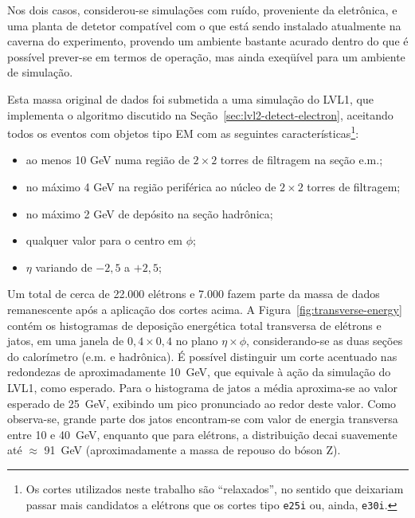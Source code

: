Nos dois casos, considerou-se simulações com ruído, proveniente da eletrônica,
e uma planta de detetor compatível com o que está sendo instalado atualmente
na caverna do experimento, provendo um ambiente bastante acurado dentro do que
é possível prever-se em termos de operação, mas ainda exeqüível para um
ambiente de simulação.

Esta massa original de dados foi submetida a uma simulação do LVL1, que
implementa o algoritmo discutido na Seção~\ref{sec:lvl2-detect-electron},
aceitando todos os eventos com objetos tipo EM com as seguintes
características\footnote{Os cortes utilizados neste trabalho são
``relaxados'', no sentido que deixariam passar mais candidatos a elétrons que
os cortes tipo \texttt{e25i} ou, ainda, \texttt{e30i}.}:

\begin{itemize}
\item ao menos 10 GeV numa região de $2\times2$ torres de filtragem na seção
e.m.;
\item no máximo 4 GeV na região periférica ao núcleo de $2\times2$ torres de
filtragem; 
\item no máximo 2 GeV de depósito na seção hadrônica;
\item qualquer valor para o centro em $\phi$;
\item $\eta$ variando de $-2,5$ a $+2,5$;
\end{itemize}

Um total de cerca de 22.000 elétrons e 7.000 fazem parte da massa de dados
remanescente após a aplicação dos cortes acima. A
Figura~\ref{fig:transverse-energy} contém os histogramas de deposição
energética total transversa de elétrons e jatos, em uma janela de $0,4 \times
0,4$ no plano $\eta\times\phi$, considerando-se as duas seções do calorímetro
(e.m. e hadrônica). É possível distinguir um corte acentuado nas redondezas de
aproximadamente 10~GeV, que equivale à ação da simulação do LVL1, como
esperado. Para o histograma de jatos a média aproxima-se ao valor esperado de
25~GeV, exibindo um pico pronunciado ao redor deste valor. Como observa-se,
grande parte dos jatos encontram-se com valor de energia transversa entre 10 e
40~GeV, enquanto que para elétrons, a distribuição decai suavemente até
$\approx$ 91~GeV (aproximadamente a massa de repouso do bóson Z).

